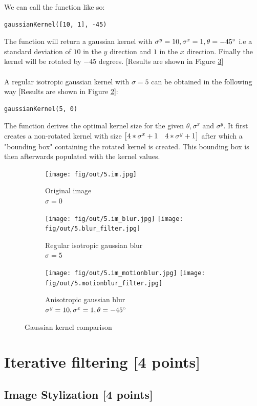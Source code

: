 \documentclass[tikz,14pt,fleqn]{article}
\begin{document}
We can call the function like so:
\vspace*{-0.5cm}
\begin{verbatim} 
gaussianKernel([10, 1], -45)
\end{verbatim}
\vspace*{-0.5cm}
The function will return a gaussian kernel with $\sigma^y=10, \sigma^x=1,\theta=-45\degree$ i.e a standard deviation of $10$ in the $y$ direction and $1$ in the $x$ direction. Finally the kernel will be rotated by $-45$ degrees. [Results are shown in Figure \ref{fig:5.3}]\\\\
A regular isotropic gaussian kernel with $\sigma=5$ can be obtained in the following way [Results are shown in Figure \ref{fig:5.2}]:
\vspace*{-0.5cm}
\begin{verbatim} 
gaussianKernel(5, 0)
\end{verbatim}
The function derives the optimal kernel size for the given $\theta,\sigma^x\text{ and }\sigma^y$. It first creates a non-rotated kernel with size $ \begin{bmatrix} 4*\sigma^x+1 & 4*\sigma^y+1 \end{bmatrix} $ after which a "bounding box" containing the rotated kernel is created. This bounding box is then afterwards populated with the kernel values.\\
\vspace*{-0.5cm}
\begin{figure}[h!]
    \centering
    \begin{subfigure}[b]{0.28\linewidth}
        \centering
        \texttt{[image: fig/out/5.im.jpg]}
        \caption{Original image\\$\sigma=0$}
        \label{fig:5.1}
    \end{subfigure}
    \begin{subfigure}[b]{0.28\linewidth}
        \centering
        \texttt{[image: fig/out/5.im\_blur.jpg]}
        \texttt{[image: fig/out/5.blur\_filter.jpg]}
        \caption{Regular isotropic gaussian blur\\$\sigma=5$}
        \label{fig:5.2}
    \end{subfigure}
    \begin{subfigure}[b]{0.28\linewidth}
        \centering
        \texttt{[image: fig/out/5.im\_motionblur.jpg]}
        \texttt{[image: fig/out/5.motionblur\_filter.jpg]}
        \caption{Anisotropic gaussian blur\\$\sigma^y=10, \sigma^x=1,\theta=-45\degree$}
        \label{fig:5.3}
    \end{subfigure}
    \caption{Gaussian kernel comparison}
    \label{fig:5}
\end{figure}

\section{Iterative filtering [4 points]}

\subsection{Image Stylization [4 points]}
\end{document}

